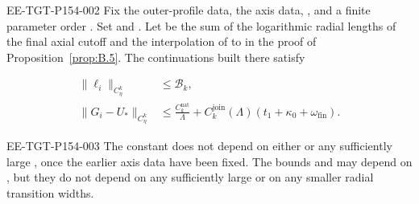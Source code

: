 \begin{lemma}\label{lem:B.7}
\begin{EESegment}{EE-TGT-P154-002}
Fix the outer-profile data, the axis data, , and a finite parameter
order . Set  and
. Let  be the sum of
the logarithmic radial lengths of the final axial cutoff and the interpolation of
 to  in the proof of
Proposition~\ref{prop:B.5}. The continuations built there satisfy
\end{EESegment}
\begin{equation}
\begin{aligned}
  \lVert\ell_i\rVert_{C_\eta^k}&\leq\mathcal B_k,\\
  \lVert G_i-U_*\rVert_{C_\eta^k}&\leq\frac{C_k^{\mathrm{nat}}}{\Lambda}
    +C_k^{\mathrm{join}}(\Lambda)(t_1+\kappa_0+\omega_{\mathrm{fin}}).
\end{aligned}
\tag{B.32}\label{eq:B.32}
\end{equation}
\begin{EESegment}{EE-TGT-P154-003}
The constant  does not depend on either
 or any sufficiently large , once the
earlier axis data have been fixed. The bounds  and
 may depend on
, but they do not depend on any sufficiently large
 or on any smaller radial transition widths.
\end{EESegment}
\end{lemma}
